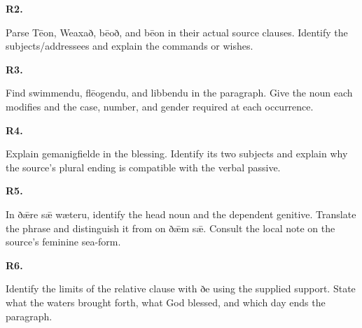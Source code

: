 \par\begin{minipage}{\linewidth}\raggedright
\textbf{R2.}

Parse Tēon, Weaxað, bēoð, and bēon in their actual source clauses. Identify the subjects/\allowbreak{}addressees and explain the commands or wishes.

\end{minipage}\par\addvspace{4pt}

\par\begin{minipage}{\linewidth}\raggedright
\textbf{R3.}

Find swimmendu, flēogendu, and libbendu in the paragraph. Give the noun each modifies and the case, number, and gender required at each occurrence.

\end{minipage}\par\addvspace{4pt}

\par\begin{minipage}{\linewidth}\raggedright
\textbf{R4.}

Explain gemanigfielde in the blessing. Identify its two subjects and explain why the source’s plural ending is compatible with the verbal passive.

\end{minipage}\par\addvspace{4pt}

\par\begin{minipage}{\linewidth}\raggedright
\textbf{R5.}

In ðǣre sǣ wæteru, identify the head noun and the dependent genitive. Translate the phrase and distinguish it from on ðǣm sǣ. Consult the local note on the source’s feminine sea-form.

\end{minipage}\par\addvspace{4pt}

\par\begin{minipage}{\linewidth}\raggedright
\textbf{R6.}

Identify the limits of the relative clause with ðe using the supplied support. State what the waters brought forth, what God blessed, and which day ends the paragraph.

\end{minipage}\par\addvspace{4pt}

